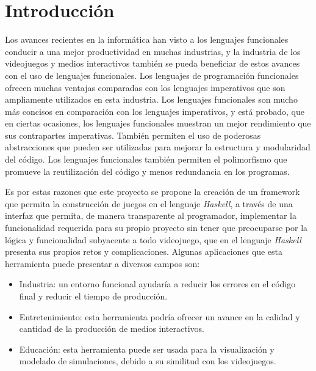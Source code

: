 \chapter{Introducción}
\label{capitulo1}

Los avances recientes en la informática han visto a los lenguajes funcionales conducir a una mejor productividad en muchas industrias, y la industria de los videojuegos y medios interactivos también se pueda beneficiar de estos avances con el uso de lenguajes funcionales. Los lenguajes de programación funcionales ofrecen muchas ventajas comparadas con los lenguajes imperativos que son ampliamente utilizados en esta industria. Los lenguajes funcionales son mucho más concisos en comparación con los lenguajes imperativos, y está probado, que en ciertas ocasiones, los lenguajes funcionales muestran un mejor rendimiento que sus contrapartes imperativas. También permiten el uso de poderosas abstracciones que pueden ser utilizadas para mejorar la estructura y modularidad del código. Los lenguajes funcionales también permiten el polimorfismo que promueve la reutilización del código y menos redundancia en los programas.

Es por estas razones que este proyecto se propone la creación de un framework que permita la construcción de juegos en el lenguaje \emph{Haskell}, a través de una interfaz que permita, de manera transparente al programador, implementar la funcionalidad requerida para su propio proyecto sin tener que preocuparse por la lógica y funcionalidad subyacente a todo videojuego, que en el lenguaje \emph{Haskell} presenta sus propios retos y complicaciones. Algunas aplicaciones que esta herramienta puede presentar a diversos campos son:

\begin{itemize}
\item Industria: un entorno funcional ayudaría a reducir los errores en el código final y reducir el tiempo de producción.
\item Entretenimiento: esta herramienta podría ofrecer un avance en la calidad y cantidad de la producción de medios interactivos.
\item Educación: esta herramienta puede ser usada para la visualización y modelado de simulaciones, debido a su similitud con los videojuegos.
\end{itemize}

